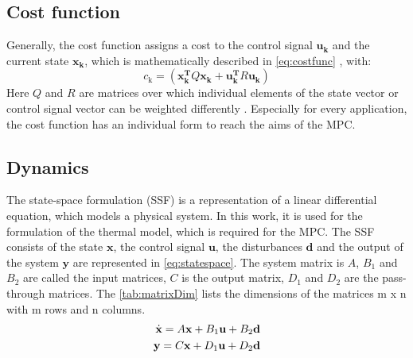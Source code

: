 \subsection{Cost function}
\label{subsection:costfunction}

    Generally, the cost function assigns a cost to the control signal $\mathbf{u_k}$ and the current state $\mathbf{x_k}$, which is mathematically described in
    \autoref{eq:costfunc}
    , with:
    \begin{equation}
    \label{eq:c_k}
    c_\text{k} = (\mathbf{x_k^T}Q\mathbf{x_k}+\mathbf{u_k^T}R\mathbf{u_k})
    \end{equation}
    Here $Q$ and $R$ are matrices over which individual elements of the state vector or control signal vector can be weighted differently \cite{Kouvaritakis.2016}.
    Especially for every application, the cost function has an individual form to reach the aims of the MPC.
    
\subsection{Dynamics}
\label{subsection:dynamics}
    
    The state-space formulation (SSF) is a representation of a linear differential equation, which models a physical system. In this work, it is used for the formulation of the thermal model, which is required for the MPC. The SSF consists of the state $\textbf{x}$, the control signal $\textbf{u}$, the disturbances $\textbf{d}$ and the output of the system $\textbf{y}$ are represented in \autoref{eq:statespace}. The system matrix is $A$, $B_\text{1}$ and $B_\text{2}$ are called the input matrices, $C$ is the output matrix, $D_\text{1}$ and $D_\text{2}$ are the pass-through matrices. The \autoref{tab:matrixDim} lists the dimensions of the matrices m x n with m rows and n columns.   
    \begin{align}
    \label{eq:statespace}
    \dot{\textbf{x}}=A\textbf{x}+B_1\textbf{u}+B_2\textbf{d}\\
    \textbf{y}=C\textbf{x}+D_1\textbf{u}+D_2\textbf{d} \notag
    \end{align}
    
